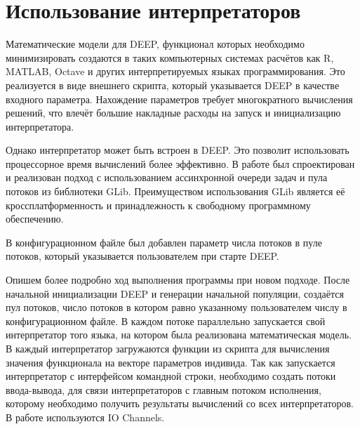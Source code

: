 \section*{Использование интерпретаторов}

Математические модели для DEEP,
функционал которых необходимо минимизировать
создаются в таких компьютерных системах расчётов
как R, MATLAB, Octave
и других интерпретируемых языках программирования.
Это реализуется в виде внешнего скрипта,
который указывается DEEP в качестве входного параметра.
Нахождение параметров требует
многократного вычисления решений,
что влечёт большие накладные расходы
на запуск и инициализацию интерпретатора.

Однако интерпретатор может быть встроен в DEEP.
Это позволит использовать процессорное время вычислений
более эффективно.
В работе был спроектирован и реализован
подход с использованием
ассинхронной очереди задач и пула потоков
из библиотеки GLib.
Преимуществом использования GLib
является её кроссплатформенность
и принадлежность к свободному программному обеспечению.

В конфигурационном файле был добавлен
параметр числа потоков в пуле потоков,
который указывается пользователем
при старте DEEP.

Опишем более подробно ход выполнения программы
при новом подходе.
После начальной инициализации DEEP
и генерации начальной популяции,
создаётся пул потоков,
число потоков в котором равно
указанному пользователем числу в
конфигурационном файле.
В каждом потоке параллельно
запускается свой интерпретатор того языка,
на котором была реализована математическая модель.
В каждый интерпретатор загружаются
функции из скрипта
для вычисления значения функционала
на векторе параметров индивида.
Так как запускается интерпретатор
с интерфейсом командной строки,
необходимо создать потоки ввода-вывода,
для связи интерпретаторов
с главным потоком исполнения,
которому необходимо получить
результаты вычислений со всех интерпретаторов.
В работе используются IO Channels.

